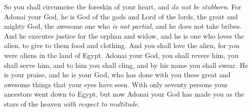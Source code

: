 \begin{biblechapter}
\verse So you shall circumcise the foreskin of your heart, and \textit{do not be stubborn}.
\verse For Adonai your God, he is God of the gods and Lord of the lords, the great and mighty God, the awesome one who \textit{is not partial}, and he does not take bribes.
\verse And he executes justice for the orphan and widow, and he is one who loves the alien, to give to them food and clothing.
\verse And you shall love the alien, for you were aliens in the land of Egypt.
\verse Adonai your God, you shall revere him, you shall serve him, and to him you shall cling, and by his name you shall swear.
\verse He is your praise, and he is your God, who has done with you these great and awesome things that your eyes have seen.
\verse With only seventy persons your ancestors went down to Egypt, but now Adonai your God has made you as the stars of the heaven \textit{with respect to multitude}.
\end{biblechapter}

